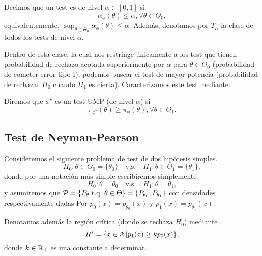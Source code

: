  \begin{definition}
 Decimos que un test es de nivel $\alpha\in[0,1]$ si 
\begin{equation}
 		\alpha_\phi(\theta)\leq\alpha, \forall \theta\in\Theta_0,
 	\end{equation}
 	equivalentemente, $\sup_{\theta\in\Theta_0}\alpha_\phi(\theta)\leq\alpha$. Además, denotamos por $T_\alpha$ la clase de todos los tests de nivel $\alpha$. 
 \end{definition}
 Dentro de esta clase, la cual nos restringe únicamente a los test que tienen probabilidad de rechazo acotada superiormente por $\alpha$  para $\theta\in\Theta_0$ (probabilidad de cometer error tipo I), podemos buscar el test de mayor potencia (probabilidad de rechazar $H_0$ cuando $H_1$ es cierta). Caracterizamos este test mediante: 

 \begin{definition}
 	Diremos que $\phi^\star$ es un test UMP (de nivel $\alpha$)  si 
 	\begin{equation}
 		\pi_{\phi^\star}(\theta)\geq \pi_{\phi}(\theta), \forall\theta\in\Theta_1.
 	\end{equation}
 	
 \end{definition}



\subsection{Test de Neyman-Pearson} 
\label{sub:test_de_neyman_pearson}
Consideremos el siguiente problema de test de dos hipótesis simples. 
\begin{equation}
	H_0:\theta\in\Theta_0=\{\theta_0\}\quad \text{v.s.}\quad H_1:\theta\in\Theta_1=\{\theta_1\},
\end{equation}
donde por una notación más simple escribiremos simplemente 
\begin{equation}
	H_0:\theta =\theta_0\quad \text{v.s.}\quad H_1:\theta = \theta_1,		
\end{equation}
y asumiremos que $\mathcal{P} = \{P_\theta\ {\text{t.q.}}\ \theta\in\Theta\}=\{P_{\theta_0},P_{\theta_1}\}$ con densidades respectivamente dadas Por $p_0(x) = p_{\theta_0}(x)$ y $p_1(x) = p_{\theta_1}(x)$.

Denotamos además la región crítica (donde se rechaza $H_0$) mediante
\begin{equation}
	R^* = \{x\in{\mathcal X} | p_1(x) \geq k p_0(x)\},
\end{equation}
donde $k\in{\mathbb R}_+$ es una constante a determinar. 

